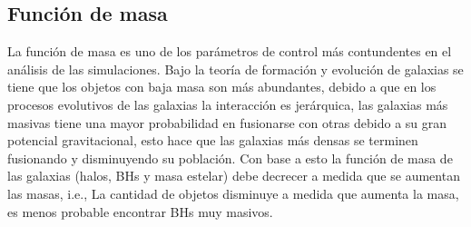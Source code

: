     \subsection{ Función de masa}
    \label{subsec: funcion de masa}
La función de masa es uno de los parámetros de control más contundentes en el análisis de las simulaciones. Bajo la teoría de formación y evolución de galaxias se tiene que los objetos con baja masa son más abundantes, debido a que en los procesos evolutivos de las galaxias la interacción es jerárquica, las galaxias más masivas tiene una mayor probabilidad en fusionarse con otras debido a su gran potencial gravitacional, esto hace que las galaxias más densas se terminen fusionando y disminuyendo su población. Con base a esto la función de masa de las galaxias (halos, BHs y masa estelar) debe decrecer a medida que se aumentan las masas, i.e., La cantidad de objetos disminuye a medida que aumenta la masa, es menos probable encontrar BHs muy masivos.

